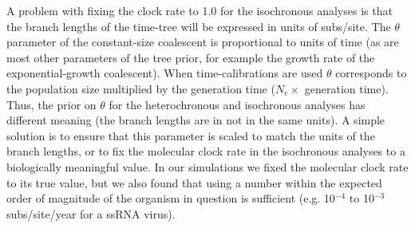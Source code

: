 \documentclass[10pt,letterpaper]{article}
\begin{document}
A problem with fixing the clock rate to 1.0 for the isochronous analyses is that the branch lengths of the time-tree will be expressed in units of subs/site. The $\theta$ parameter of the constant-size coalescent is proportional to units of time \cite{ho2011skyline, drummond2002estimating} (as are most other parameters of the tree prior, for example the growth rate of the exponential-growth coalescent). When time-calibrations are used $\theta$ corresponds to the population size multiplied by the generation time ($N_e \times$ generation time). Thus, the prior on $\theta$ for the heterochronous and isochronous analyses has different meaning (the branch lengths are in not in the same units). A simple solution is to ensure that this parameter is scaled to match the units of the branch lengths, or to fix the molecular clock rate in the isochronous analyses to a biologically meaningful value. In our simulations we fixed the molecular clock rate to its true value, but we also found that using a number within the expected order of magnitude of the organism in question is sufficient (e.g. 10$^{-4}$ to 10$^{-3}$ subs/site/year for a ssRNA virus).
\end{document}
